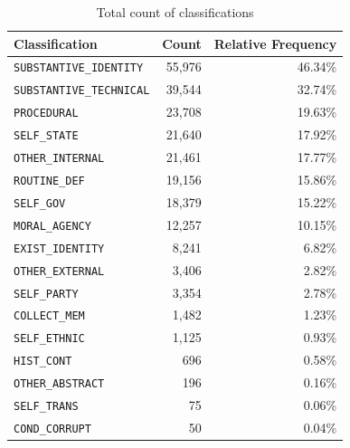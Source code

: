 \begin{table}[ht]
    \centering
    \caption{Total count of classifications}
    \begin{tabular}{lrr}
    \toprule
    Classification & Count & Relative Frequency \\
    \midrule
    \texttt{SUBSTANTIVE\_IDENTITY} & 55,976 & 46.34\% \\
    \texttt{SUBSTANTIVE\_TECHNICAL} & 39,544 & 32.74\% \\
    \texttt{PROCEDURAL} & 23,708 & 19.63\% \\
    \texttt{SELF\_STATE} & 21,640 & 17.92\% \\
    \texttt{OTHER\_INTERNAL} & 21,461 & 17.77\% \\
    \texttt{ROUTINE\_DEF} & 19,156 & 15.86\% \\
    \texttt{SELF\_GOV} & 18,379 & 15.22\% \\
    \texttt{MORAL\_AGENCY} & 12,257 & 10.15\% \\
    \texttt{EXIST\_IDENTITY} & 8,241 & 6.82\% \\
    \texttt{OTHER\_EXTERNAL} & 3,406 & 2.82\% \\
    \texttt{SELF\_PARTY} & 3,354 & 2.78\% \\
    \texttt{COLLECT\_MEM} & 1,482 & 1.23\% \\
    \texttt{SELF\_ETHNIC} & 1,125 & 0.93\% \\
    \texttt{HIST\_CONT} & 696 & 0.58\% \\
    \texttt{OTHER\_ABSTRACT} & 196 & 0.16\% \\
    \texttt{SELF\_TRANS} & 75 & 0.06\% \\
    \texttt{COND\_CORRUPT} & 50 & 0.04\% \\
    \bottomrule
    \end{tabular}
    \label{tab:class_counts}
\end{table}


